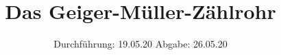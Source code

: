 

\subject{V703}
\title{Das Geiger-Müller-Zählrohr}
\date{%
  Durchführung: 19.05.20
  \hspace{3em}
  Abgabe: 26.05.20
}



\maketitle
\thispagestyle{empty}
\tableofcontents
\newpage








\printbibliography{}


